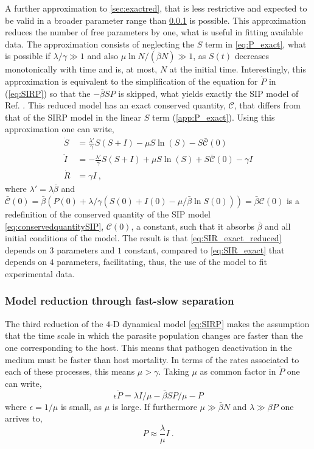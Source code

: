 A further approximation to \cref{sec:exactred}, that is less restrictive
and expected to be valid in a broader parameter range than \cref{sec:fastslow}
is possible. This approximation reduces the number of free parameters by one,
what is useful in fitting available data.
The approximation consists of neglecting the
$S$ term in \cref{eq:P_exact}, what is possible if $\lambda/\gamma\gg 1$
and also $\mu\ln N/(\bar{\beta} N)\gg 1$, as $S(t)$ decreases monotonically
with time and is, at most, $N$ at the initial time. Interestingly, this
approximation is equivalent to the simplification of the equation for $\dot{P}$
in (\cref{eq:SIRP}) so that the $-\bar{\beta}SP$ is skipped, what yields
exactly
the SIP model of Ref. \cite{article_SIP}. This reduced model has an exact
conserved quantity, $\mathcal{C}$, that differs from that of the SIRP model in
the linear $S$ term (\cref{app:P_exact}).
Using this approximation one can write,
\begin{equation}\label{eq:SIR_exact_reduced}
    \begin{aligned}
        \dot{S} & =\frac{\lambda'}{\gamma}S(S+I)-\mu
        S\ln(S)-S\bar{\mathcal{C}}(0)                 \\
        \dot{I} & =-\frac{\lambda'}{\gamma}S(S+I)+\mu
        S\ln(S)+S\bar{\mathcal{C}}(0)-\gamma I        \\
        \dot{R} & =\gamma I \ ,
    \end{aligned}
\end{equation}
where $\lambda'=\lambda\bar{\beta}$ and $\bar{\mathcal{C}}(0)=\bar{\beta}
    (P(0)+\lambda/\gamma(S(0)+I(0)-\mu/\bar{\beta}\ln S(0)))=\bar{\beta}
    \mathcal{C}(0)$ is a redefinition of the conserved quantity of the SIP
model
\cref{eq:conservedquantitySIP}, $\mathcal{C}(0)$, a constant, such that it
absorbs $\bar{\beta}$ and all initial conditions of the model. The result is
that \cref{eq:SIR_exact_reduced} depends on $3$ parameters and $1$ constant,
compared to \cref{eq:SIR_exact} that depends on $4$ parameters,
facilitating, thus, the use of the model to fit experimental data.

\subsubsection{Model reduction through fast-slow separation}
\label{sec:fastslow}

The third
reduction of the $4$-D dynamical model \cref{eq:SIRP} makes the assumption
that
the time scale in which the parasite population changes are faster than the
one corresponding to the host. This means that pathogen deactivation in the
medium must be faster than host mortality. In terms of the rates associated to
each of these processes, this means $\mu>\gamma$. Taking $\mu$ as common factor
in $\dot{P}$ one can write,
\begin{equation}
    \epsilon \dot{P} =\lambda I/\mu-\bar{\beta}SP/\mu-P
\end{equation}
where $\epsilon=1/\mu$ is small, as $\mu$ is large. If furthermore
$\mu\gg\bar{\beta}N$ and  $\lambda\gg \beta P$ one arrives to,
\begin{equation}\label{eq:P_approx}
    P\approx \frac{\lambda}{\mu} I \ .
\end{equation}

